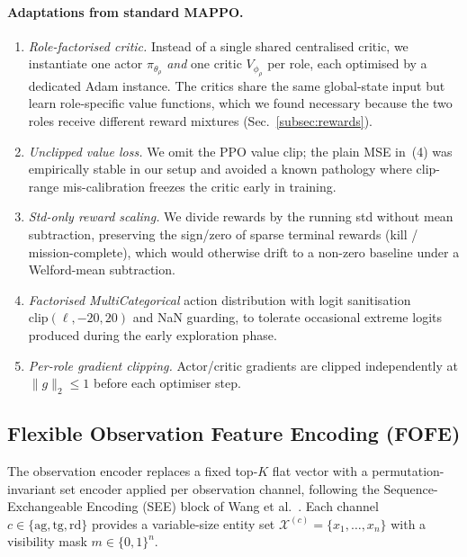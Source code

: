 \documentclass[11pt,a4paper]{article}
\begin{document}
\paragraph{Adaptations from standard MAPPO.}
\begin{enumerate}[leftmargin=1.25em]
\item \emph{Role-factorised critic.} Instead of a single shared centralised
critic, we instantiate one actor $\pi_{\theta_\rho}$ \emph{and} one critic
$V_{\phi_\rho}$ per role, each optimised by a dedicated Adam instance. The
critics share the same global-state input but learn role-specific value
functions, which we found necessary because the two roles receive different
reward mixtures (Sec.~\ref{subsec:rewards}).
\item \emph{Unclipped value loss.} We omit the PPO value clip; the plain MSE
in~(4) was empirically stable in our setup and avoided a known pathology
where clip-range mis-calibration freezes the critic early in training.
\item \emph{Std-only reward scaling.} We divide rewards by the running std
without mean subtraction, preserving the sign/zero of sparse terminal
rewards (kill / mission-complete), which would otherwise drift to a
non-zero baseline under a Welford-mean subtraction.
\item \emph{Factorised MultiCategorical} action distribution with logit
sanitisation $\mathrm{clip}(\ell,-20,20)$ and NaN guarding, to tolerate
occasional extreme logits produced during the early exploration phase.
\item \emph{Per-role gradient clipping.} Actor/critic gradients are clipped
independently at $\lVert g\rVert_2\le 1$ before each optimiser step.
\end{enumerate}

\subsection{Flexible Observation Feature Encoding (FOFE)}
The observation encoder replaces a fixed top-$K$ flat vector with a
permutation-invariant set encoder applied per observation channel, following
the Sequence-Exchangeable Encoding (SEE) block of Wang et al.~\cite{wang2026fofe}.
Each channel $c\in\{\text{ag},\text{tg},\text{rd}\}$ provides a variable-size
entity set $\mathcal{X}^{(c)}\!=\!\{x_1,\dots,x_n\}$ with a visibility mask
$m\in\{0,1\}^n$.
\end{document}
